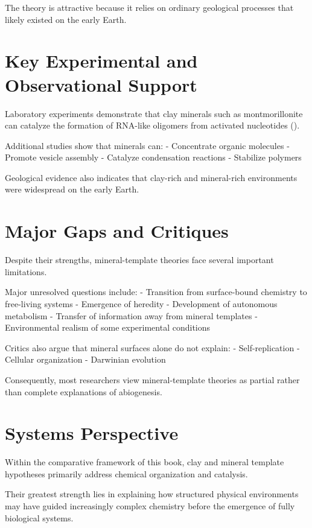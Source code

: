 \documentclass[
  oneside]{book}
\begin{document}
The theory is attractive because it relies on ordinary geological processes that likely existed on the early Earth.

\section{Key Experimental and Observational Support}\label{key-experimental-and-observational-support-5}

Laboratory experiments demonstrate that clay minerals such as montmorillonite can catalyze the formation of RNA-like oligomers from activated nucleotides ().

Additional studies show that minerals can:
- Concentrate organic molecules
- Promote vesicle assembly
- Catalyze condensation reactions
- Stabilize polymers

Geological evidence also indicates that clay-rich and mineral-rich environments were widespread on the early Earth.

\section{Major Gaps and Critiques}\label{major-gaps-and-critiques-5}

Despite their strengths, mineral-template theories face several important limitations.

Major unresolved questions include:
- Transition from surface-bound chemistry to free-living systems
- Emergence of heredity
- Development of autonomous metabolism
- Transfer of information away from mineral templates
- Environmental realism of some experimental conditions

Critics also argue that mineral surfaces alone do not explain:
- Self-replication
- Cellular organization
- Darwinian evolution

Consequently, most researchers view mineral-template theories as partial rather than complete explanations of abiogenesis.

\section{Systems Perspective}\label{systems-perspective-5}

Within the comparative framework of this book, clay and mineral template hypotheses primarily address chemical organization and catalysis.

Their greatest strength lies in explaining how structured physical environments may have guided increasingly complex chemistry before the emergence of fully biological systems.
\end{document}
